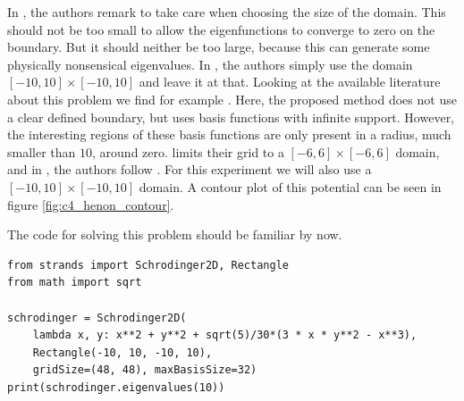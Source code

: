 In \cite{wang_new_2009}, the authors remark to take care when choosing the size of the domain. This should not be too small to allow the eigenfunctions to converge to zero on the boundary. But it should neither be too large, because this can generate some physically nonsensical eigenvalues. In \cite{wang_new_2009}, the authors simply use the domain $[-10, 10] \times [-10, 10]$ and leave it at that. Looking at the available literature about this problem we find for example \cite{davis_semiclassical_1979}. Here, the proposed method does not use a clear defined boundary, but uses basis functions with infinite support. However, the interesting regions of these basis functions are only present in a radius, much smaller than $10$, around zero. \cite{braun_efficient_1996} limits their grid to a $[-6, 6] \times [-6, 6]$ domain, and in \cite{baeyens_improvements_2022}, the authors follow \cite{braun_efficient_1996}. For this experiment we will also use a $[-10, 10] \times [-10, 10]$ domain. A contour plot of this potential can be seen in figure \ref{fig:c4_henon_contour}.

The code for solving this problem should be familiar by now.
\begin{verbatim}
from strands import Schrodinger2D, Rectangle
from math import sqrt

schrodinger = Schrodinger2D(
    lambda x, y: x**2 + y**2 + sqrt(5)/30*(3 * x * y**2 - x**3),
    Rectangle(-10, 10, -10, 10),
    gridSize=(48, 48), maxBasisSize=32)
print(schrodinger.eigenvalues(10))
\end{verbatim}

